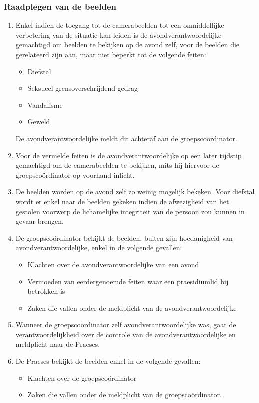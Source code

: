     \subsubsection{Raadplegen van de beelden}
    \begin{enumerate}
        \item Enkel indien de toegang tot de camerabeelden tot een onmiddellijke verbetering van de situatie kan leiden is de avondverantwoordelijke gemachtigd om beelden te bekijken op de avond zelf, voor de beelden die gerelateerd zijn aan, maar niet beperkt tot de volgende feiten:
        \begin{itemize}
            \item Diefstal
            \item Seksueel grensoverschrijdend gedrag
            \item Vandalisme
            \item Geweld
        \end{itemize}
        De avondverantwoordelijke meldt dit achteraf aan de groepsco\"ordinator.
        \item Voor de vermelde feiten is de avondverantwoordelijke op een later tijdstip gemachtigd om de camerabeelden te bekijken, mits hij hiervoor de groepsco\"ordinator op voorhand inlicht. 
        \item De beelden worden op de avond zelf zo weinig mogelijk bekeken. Voor diefstal wordt er enkel naar de beelden gekeken indien de afwezigheid van het gestolen voorwerp de lichamelijke integriteit van de persoon zou kunnen in gevaar brengen.
        \item\label{art:groepscoo_camera_fak} De groepsco\"ordinator bekijkt de beelden, buiten zijn hoedanigheid van avondverantwoordelijke, enkel in de volgende gevallen:
            \begin{itemize}
                \item Klachten over de avondverantwoordelijke van een avond
                \item Vermoeden van eerdergenoemde feiten waar een praesidiumlid bij betrokken is
                \item Zaken die vallen onder de meldplicht van de avondverantwoordelijke
            \end{itemize}
        \item Wanneer de groepsco\"ordinator zelf avondverantwoordelijke was, gaat de verantwoordelijkheid over de controle van de avondverantwoordelijke en meldplicht naar de Praeses.
        \item De Praeses bekijkt de beelden enkel in de volgende gevallen:
        \begin{itemize}
            \item Klachten over de groepsco\"ordinator
            \item Zaken die vallen onder de meldplicht van de groepsco\"ordinator.
        \end{itemize}
    \end{enumerate}


